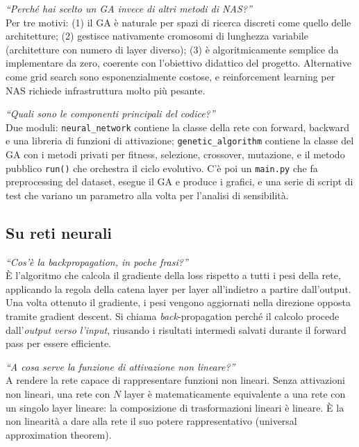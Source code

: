 \documentclass[11pt,a4paper]{article}
\begin{document}
\begin{domanda}
\textit{``Perché hai scelto un GA invece di altri metodi di NAS?''}\\
Per tre motivi: (1) il GA è naturale per spazi di ricerca discreti come
quello delle architetture; (2) gestisce nativamente cromosomi di
lunghezza variabile (architetture con numero di layer diverso); (3) è
algoritmicamente semplice da implementare da zero, coerente con
l'obiettivo didattico del progetto. Alternative come grid search sono
esponenzialmente costose, e reinforcement learning per NAS richiede
infrastruttura molto più pesante.
\end{domanda}

\begin{domanda}
\textit{``Quali sono le componenti principali del codice?''}\\
Due moduli: \texttt{neural\_network} contiene la classe della rete con
forward, backward e una libreria di funzioni di attivazione;
\texttt{genetic\_algorithm} contiene la classe del GA con i metodi
privati per fitness, selezione, crossover, mutazione, e il metodo
pubblico \texttt{run()} che orchestra il ciclo evolutivo. C'è poi un
\texttt{main.py} che fa preprocessing del dataset, esegue il GA e produce
i grafici, e una serie di script di test che variano un parametro alla
volta per l'analisi di sensibilità.
\end{domanda}

\subsection{Su reti neurali}

\begin{domanda}
\textit{``Cos'è la backpropagation, in poche frasi?''}\\
È l'algoritmo che calcola il gradiente della loss rispetto a tutti i
pesi della rete, applicando la regola della catena layer per layer
all'indietro a partire dall'output. Una volta ottenuto il gradiente, i
pesi vengono aggiornati nella direzione opposta tramite gradient descent.
Si chiama \emph{back}-propagation perché il calcolo procede
dall'\emph{output verso l'input}, riusando i risultati intermedi
salvati durante il forward pass per essere efficiente.
\end{domanda}

\begin{domanda}
\textit{``A cosa serve la funzione di attivazione non lineare?''}\\
A rendere la rete capace di rappresentare funzioni non lineari. Senza
attivazioni non lineari, una rete con $N$ layer è matematicamente
equivalente a una rete con un singolo layer lineare: la composizione di
trasformazioni lineari è lineare. È la non linearità a dare alla rete il
suo potere rappresentativo (universal approximation theorem).
\end{domanda}
\end{document}
